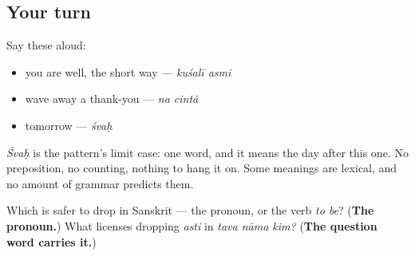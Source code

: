 \subsection*{Your turn}
Say these aloud:

\begin{itemize}
\raggedright
  \item you are well, the short way — \emph{kuśalī asmi}
  \item wave away a thank-you — \emph{na cintā}
  \item tomorrow — \emph{śvaḥ}
\end{itemize}

\emph{Śvaḥ} is the pattern's limit case: one word, and it means the day after this one. No preposition, no counting, nothing to hang it on. Some meanings are lexical, and no amount of grammar predicts them.

\begin{tcolorbox}[breakable,colback=teal!4,colframe=teal!35!black,title={Before you move on}]
Which is safer to drop in Sanskrit — the pronoun, or the verb \emph{to be}? (\textbf{The pronoun.}) What licenses dropping \emph{asti} in \emph{tava nāma kim?} (\textbf{The question word carries it.})
\end{tcolorbox}
